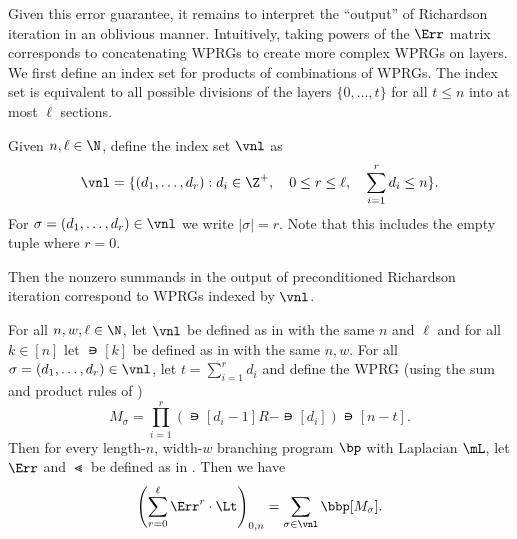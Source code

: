 \documentclass{toc}
\begin{document}
Given this error guarantee, it remains to interpret the ``output'' of Richardson iteration in an oblivious manner. Intuitively, taking powers of the $\Err$ matrix corresponds to concatenating WPRGs to create more complex WPRGs on layers. We first define an index set for products of combinations of WPRGs. The index set is equivalent to all possible divisions of the layers $\{0,\ldots,t\}$ for all $t\leq n$ into at most $\ell$ sections.
\begin{definition}\label{def:pathIndex}
Given $n,\ell \in \N$, define the index set $\vnl$ as
\[\vnl = \{(d_1,\dots, d_r) : d_i\in \Z^+, \quad 0\leq r\leq \ell,\quad \sum_{i=1}^rd_i\leq n\}.\]
For $\sigma=(d_1,\dots,d_r) \in \vnl$ we write $|\sigma|=r$. Note that this includes the empty tuple where $r=0$.
\end{definition}
Then the nonzero summands in the output of preconditioned %
Richardson  %
iteration correspond to WPRGs indexed by $\vnl$.
\begin{lemma}\label{lem:richardSummandsPath}
For all $n,w,\ell \in \N$, let $\vnl$ be defined as in  with the same $n$ and $\ell$ and for all $k\in[n]$ let $\nis[k]$ be defined as in  with the same $n,w$. For all $\sigma=(d_1,\dots,d_r) \in \vnl$, let $t=\sum_{i=1}^rd_i$ and define the WPRG (using the sum and product rules of 
%
 )  %
\[M_\sigma = \prod_{i=1}^r\left(\nis[d_i-1]R-\nis[d_i]\right)\nis[n-t].\]
Then for every length-$n$, width-$w$ branching program $\bp$ with Laplacian $\mL$, let $\Err$ and $\Lt$ be defined as in . Then we have
\[\left(\sum_{r=0}^\ell\Err^r\cdot \Lt\right)_{0,n} = \sum_{\sigma \in \vnl}\bbp[M_\sigma].\]
\end{lemma}
\end{document}
